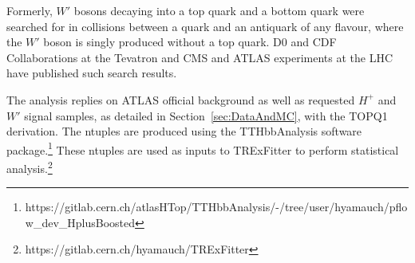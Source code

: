 Formerly, $W'$ bosons decaying into a top quark and a bottom quark were searched for in collisions between a quark and an antiquark of any flavour, where the $W'$ boson is singly produced without a top quark.  D0 \cite{abazov2011search} and CDF \cite{aaltonen2009search} Collaborations at the Tevatron and CMS \cite{CMS-EXO-12-001,CMS-B2G-12-010,CMS-B2G-17-010,CMS-B2G-20-005} and ATLAS \cite{TOPQ-2012-19,EXOT-2013-14,EXOT-2017-02,EXOT-2016-18} experiments at the LHC have published such search results.


The analysis replies on ATLAS official background as well as requested $H^+$ and $W'$ signal samples, as detailed in Section~\ref{sec:DataAndMC}, with the TOPQ1 derivation. The ntuples are produced using the TTHbbAnalysis software package.\footnote{https://gitlab.cern.ch/atlasHTop/TTHbbAnalysis/-/tree/user/hyamauch/pflow\_dev\_HplusBoosted} These ntuples are used as inputs to TRExFitter to perform statistical analysis.\footnote{https://gitlab.cern.ch/hyamauch/TRExFitter}
